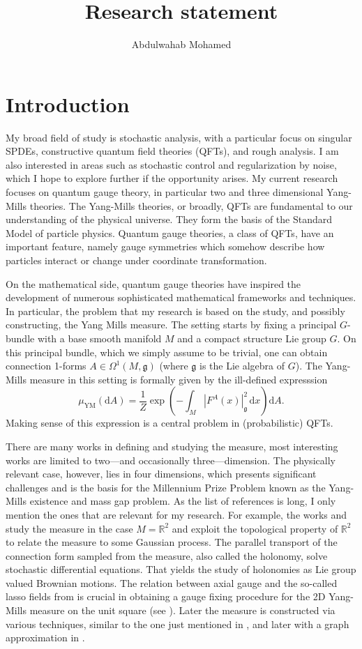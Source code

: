 \documentclass[11pt]{article}
\title{Research statement}
\author{Abdulwahab Mohamed}
\numberwithin{equation}{section}
\theoremstyle{definition}
\theoremstyle{remark}
\newcommand{\diff}{\mathrm{d}}
\newcommand{\R}{\mathbb R}
\newcommand{\1}{\mathbf 1}
\newcommand{\<}{\langle}
\renewcommand{\>}{\rangle}
\begin{document}
\maketitle


\section{Introduction}
My broad field of study is stochastic analysis, with a particular focus on singular SPDEs, constructive quantum field theories (QFTs), and rough analysis. I am also interested in  areas such as stochastic control and regularization by noise, which I hope to explore further if the opportunity arises.
%
My current research focuses on quantum gauge theory, in particular two and three dimensional Yang-Mills theories. The Yang-Mills theories, or broadly,   QFTs are fundamental to our understanding of the physical universe. They form the basis of the Standard Model of particle physics. Quantum gauge theories, a class of QFTs, have an important feature, namely gauge symmetries which somehow describe how particles interact or change under coordinate transformation. 

On the mathematical side, quantum gauge theories have inspired the development of numerous sophisticated mathematical frameworks and techniques. In particular, the problem that my research is based on the study, and possibly constructing, the Yang Mills measure. The setting starts by fixing a principal $G$-bundle with a base smooth manifold $M$ and a compact structure Lie group $G$. On this principal bundle, which we simply assume to be trivial, one can obtain connection 1-forms $A\in \Omega^1(M,\mathfrak g)$ (where  $\mathfrak g$ is the Lie algebra of $G$).  The Yang-Mills measure in this setting is formally given by the ill-defined expresssion
\[
\mu_{\mathrm{YM}}(\diff A)=\frac 1 Z\exp\left(-\int_{M}|F^A(x)|_{\mathfrak g}^2\,\diff x\right)\diff A.
\]
Making sense of this expression is a central problem in (probabilistic) QFTs. 

There are many works in defining and studying the measure, most interesting works are limited to two—and occasionally three—dimension. The physically relevant case, however, lies in four dimensions, which presents significant challenges and is the basis for the Millennium Prize Problem known as the Yang-Mills existence and mass gap problem. As the list of references is long, I only mention the ones that are relevant for my research.  For example, the works \cite{Driver89} and \cite{GKS89} study the measure in the case $M=\R^2$ and exploit the topological property of $\R^2$ to relate the measure to some Gaussian process. The parallel transport of the connection form sampled from the measure, also called the holonomy, solve stochastic differential equations. That yields the study of holonomies as Lie group valued Brownian motions. The relation between axial gauge and the so-called lasso fields from \cite{Driver89} is crucial in obtaining a gauge fixing procedure for the 2D Yang-Mills measure on the unit square (see ). Later the measure is constructed via various techniques, similar to the one just mentioned in \cite{Sengupta97}, and later with a graph approximation in \cite{Levy03}. 
\end{document}
